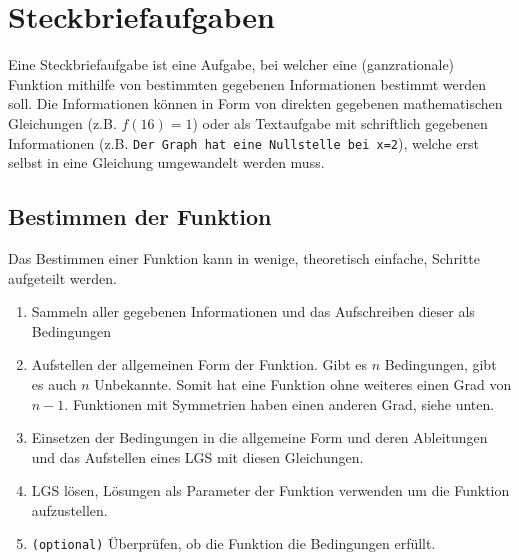 \documentclass{article}
\begin{document}
\section{Steckbriefaufgaben}
Eine Steckbriefaufgabe ist eine Aufgabe, bei welcher eine (ganzrationale) Funktion mithilfe von bestimmten gegebenen Informationen bestimmt werden soll. Die Informationen können in Form von direkten gegebenen mathematischen Gleichungen (z.B. $f(16)=1$) oder als Textaufgabe mit schriftlich gegebenen Informationen (z.B. \texttt{Der Graph hat eine Nullstelle bei x=2}), welche erst selbst in eine Gleichung umgewandelt werden muss. 
 
\subsection{Bestimmen der Funktion}
Das Bestimmen einer Funktion kann in wenige, theoretisch einfache, Schritte aufgeteilt werden. 
\begin{enumerate}
 \item Sammeln aller gegebenen Informationen und das Aufschreiben dieser als Bedingungen
 \item Aufstellen der allgemeinen Form der Funktion. Gibt es $n$ Bedingungen, gibt es auch $n$ Unbekannte. Somit hat eine Funktion ohne weiteres einen Grad von $n-1$. Funktionen mit Symmetrien haben einen anderen Grad, siehe unten. 
 \item Einsetzen der Bedingungen in die allgemeine Form und deren Ableitungen und das Aufstellen eines LGS mit diesen Gleichungen.
 \item LGS lösen, Lösungen als Parameter der Funktion verwenden um die Funktion aufzustellen.
 \item \texttt{(optional)} Überprüfen, ob die Funktion die Bedingungen erfüllt.
\end{enumerate} 
 
\end{document}

